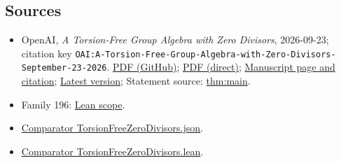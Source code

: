 \documentclass[11pt]{article}
\begin{document}
\subsection{Sources}
\begin{itemize}
\item OpenAI, \emph{A Torsion-Free Group Algebra with Zero Divisors}, 2026-09-23; citation key \texttt{OAI:A-Torsion-Free-Group-Algebra-with-Zero-Divisors-September-23-2026}. \href{https://github.com/openai/math/blob/adc7f1241b42e322a6451854ab7e4b4c146bf78a/preprints/A-Torsion-Free-Group-Algebra-with-Zero-Divisors-September-23-2026/paper.pdf}{PDF (GitHub)}; \href{https://github.com/openai/math/raw/adc7f1241b42e322a6451854ab7e4b4c146bf78a/preprints/A-Torsion-Free-Group-Algebra-with-Zero-Divisors-September-23-2026/paper.pdf}{PDF (direct)}; \href{https://github.com/openai/math/blob/adc7f1241b42e322a6451854ab7e4b4c146bf78a/preprints/A-Torsion-Free-Group-Algebra-with-Zero-Divisors-September-23-2026/README.md}{Manuscript page and citation}; \href{https://github.com/openai/math/blob/main/preprints/A-Torsion-Free-Group-Algebra-with-Zero-Divisors-September-23-2026/paper.pdf}{Latest version}; Statement source: \href{https://github.com/openai/math/blob/adc7f1241b42e322a6451854ab7e4b4c146bf78a/preprints/A-Torsion-Free-Group-Algebra-with-Zero-Divisors-September-23-2026/build/paper.tex\#L52}{thm:main}.
\item Family 196: \href{https://github.com/openai/math/blob/adc7f1241b42e322a6451854ab7e4b4c146bf78a/lean/docs/196.md}{Lean scope}.
\item \href{https://github.com/openai/math/blob/adc7f1241b42e322a6451854ab7e4b4c146bf78a/lean/ComparatorChallenges/TorsionFreeZeroDivisors.json}{Comparator TorsionFreeZeroDivisors.json}.
\item \href{https://github.com/openai/math/blob/adc7f1241b42e322a6451854ab7e4b4c146bf78a/lean/ComparatorChallenges/TorsionFreeZeroDivisors.lean}{Comparator TorsionFreeZeroDivisors.lean}.

\end{itemize}
\end{document}
